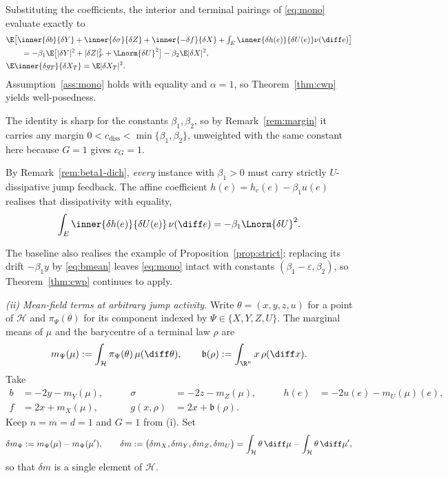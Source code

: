 \begin{example}
Substituting the coefficients, the interior and terminal pairings of \eqref{eq:mono} evaluate
exactly to
\[
\begin{aligned}
&\E\big[\inner{\delta b}{\delta Y}+\inner{\delta\sigma}{\delta Z}+\inner{-\delta f}{\delta X}
+\textstyle\int_E\inner{\delta h(e)}{\delta U(e)}\nu(\diff e)\big]\\
&\qquad=-\beta_1\E\big[|\delta Y|^2+|\delta Z|_F^2+\Lnorm{\delta U}^2\big]-\beta_2\E|\delta X|^2,\\
&\E\inner{\delta g_T}{\delta X_T}=\E|\delta X_T|^2 .
\end{aligned}
\]
Assumption~\ref{ass:mono} holds with equality and $\alpha=1$, so Theorem~\ref{thm:cwp}
yields well-posedness.

The identity is sharp for the constants $\beta_1,\beta_2$, so by Remark~\ref{rem:margin} it
carries any margin $0<c_{\mathrm{diss}}<\min\{\beta_1,\beta_2\}$, unweighted with the same
constant here because $G=1$ gives $c_G=1$.

By Remark~\ref{rem:beta1-dich}, \emph{every} instance with $\beta_1>0$ must carry strictly
$U$-dissipative jump feedback. The affine coefficient $h(e)=h_c(e)-\beta_1u(e)$ realises that
dissipativity with equality,
\[
\int_E\inner{\delta h(e)}{\delta U(e)}\,\nu(\diff e)=-\beta_1\Lnorm{\delta U}^2 .
\]

The baseline also realises the example of Proposition~\ref{prop:strict}: replacing its
drift $-\beta_1y$ by \eqref{eq:bmean} leaves \eqref{eq:mono} intact with constants
$(\beta_1-\varepsilon,\beta_2)$, so Theorem~\ref{thm:cwp} continues to apply.

\smallskip
\emph{(ii) Mean-field terms at arbitrary jump activity.} Write $\theta=(x,y,z,u)$ for a point
of $\mathcal H$ and $\pi_\Psi(\theta)$ for its component indexed by
$\Psi\in\{X,Y,Z,U\}$. The marginal
means of $\mu$ and the barycentre of a terminal law $\rho$ are
\[
m_\Psi(\mu):=\int_{\mathcal H}\pi_\Psi(\theta)\,\mu(\diff\theta),\qquad
\mathfrak b(\rho):=\int_{\R^n}x\,\rho(\diff x) .
\]
Take
\[
\begin{aligned}
b&=-2y-m_Y(\mu), &\qquad \sigma&=-2z-m_Z(\mu), &\qquad h(e)&=-2u(e)-m_U(\mu)(e),\\
f&=2x+m_X(\mu), &\qquad g(x,\rho)&=2x+\mathfrak b(\rho) .
\end{aligned}
\]
Keep $n=m=d=1$ and $G=1$ from (i). Set
\[
\delta m_\Psi:=m_\Psi(\mu)-m_\Psi(\mu'),\qquad
\delta m:=\big(\delta m_X,\delta m_Y,\delta m_Z,\delta m_U\big)
=\int_{\mathcal H}\theta\,\diff\mu-\int_{\mathcal H}\theta\,\diff\mu' ,
\]
so that $\delta m$ is a single element of $\mathcal H$.


\end{example}
